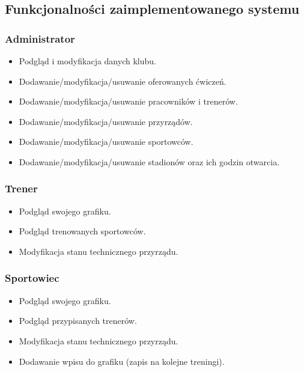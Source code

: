 \documentclass[11pt,a4paper]{article}
\begin{document}
\subsection{Funkcjonalności zaimplementowanego systemu}

\subsubsection{Administrator}
\begin{itemize}
    \item Podgląd i modyfikacja danych klubu.
    \item Dodawanie/modyfikacja/usuwanie oferowanych ćwiczeń.
    \item Dodawanie/modyfikacja/usuwanie pracowników i trenerów.
    \item Dodawanie/modyfikacja/usuwanie przyrządów.
    \item Dodawanie/modyfikacja/usuwanie sportowców.
    \item Dodawanie/modyfikacja/usuwanie stadionów oraz ich godzin otwarcia.
\end{itemize}

\subsubsection{Trener}
\begin{itemize}
    \item Podgląd swojego grafiku.
    \item Podgląd trenowanych sportowców.
    \item Modyfikacja stanu technicznego przyrządu.
\end{itemize}

\subsubsection{Sportowiec}
\begin{itemize}
    \item Podgląd swojego grafiku.
    \item Podgląd przypisanych trenerów.
    \item Modyfikacja stanu technicznego przyrządu.
    \item Dodawanie wpisu do grafiku (zapis na kolejne treningi).
\end{itemize}

\clearpage
\end{document}
